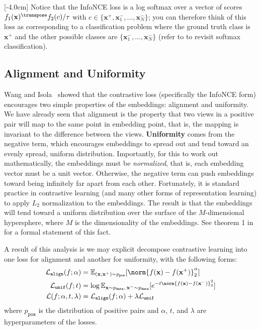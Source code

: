 [-4.0cm]
Notice that the InfoNCE loss is a log softmax over a vector of scores $f_1(\mathbf{x})^\transpose f_2(c)/\tau$ with $c \in \{\mathbf{x}^+, \mathbf{x}_1^-, \ldots, \mathbf{x}_N^-\}$; you can therefore think of this loss as corresponding to a classification problem where the ground truth class is $\mathbf{x}^+$ and the other possible classes are $\{\mathbf{x}_1^-, \ldots, \mathbf{x}_N^-\}$ (refer to \chap{\ref{chapter:intro_to_learning}} to revisit softmax classification).

\subsection{Alignment and Uniformity}
Wang and Isola~\cite{wang2020hypersphere} showed that the contrastive loss (specifically the InfoNCE form) encourages two simple properties of the embeddings: alignment and uniformity. We have already seen that alignment is the property that two views in a positive pair will map to the same point in embedding point, that is, the mapping is invariant to the difference between the views. \textbf{Uniformity} comes from the negative term, which encourages embeddings to spread out and tend toward an evenly spread, uniform distribution. Importantly, for this to work out mathematically, the embeddings must be \textit{normalized}, that is, each embedding vector must be a unit vector. Otherwise, the negative term can push embeddings toward being infinitely far apart from each other. Fortunately, it is standard practice in contrastive learning (and many other forms of representation learning) to apply $L_2$ normalization to the embeddings. The result is that the embeddings will tend toward a uniform distribution over the surface of the $M$-dimensional hypersphere, where $M$ is the dimensionality of the embeddings. See theorem 1 in \cite{wang2020hypersphere} for a formal statement of this fact.

A result of this analysis is we may explicit decompose contrastive learning into one loss for alignment and another for uniformity, with the following forms:
\begin{align}
    \mathcal{L}_{\texttt{align}}(f;\alpha) & = \mathbb{E}_{(\mathbf{x},\mathbf{x}^+) \sim p_{\texttt{pos}}} [\norm{f(\mathbf{x}) - f(\mathbf{x}^+)}_2^{\alpha}]                               \\
    \mathcal{L}_{\texttt{unif}}(f;t)       & = \log \mathbb{E}_{\mathbf{x} \sim p_{\texttt{data}}, \, \mathbf{x}^- \sim p_{\texttt{data}}} [e^{-t\norm{f(\mathbf{x}) - f(\mathbf{x}^-)}_2^2}] \\
    \mathcal{L}(f;\alpha,t,\lambda)        & = \mathcal{L}_{\texttt{align}}(f;\alpha) + \lambda \mathcal{L}_{\texttt{unif}}
\end{align}
where $p_{\texttt{pos}}$ is the distribution of positive pairs and $\alpha$, $t$, and $\lambda$ are hyperparameters of the losses.

